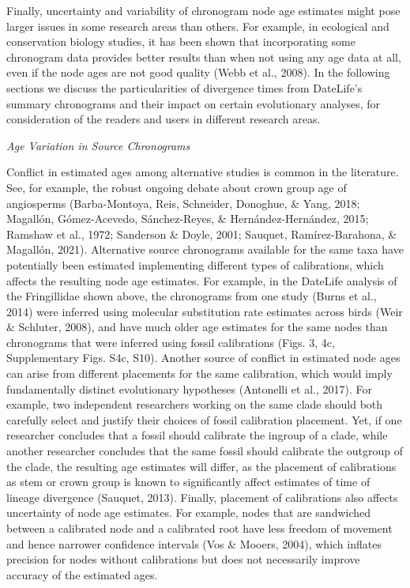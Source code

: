 \documentclass[english,man]{apa6}
\begin{document}
Finally, uncertainty and variability of chronogram node age estimates might pose larger issues in some research areas than others. For example, in ecological and conservation biology studies, it has been shown that incorporating some chronogram data provides better results than when not using any age data at all, even if the node ages are not good quality (Webb et al., 2008). In the following sections we discuss the particularities of divergence times from DateLife's summary chronograms and their impact on certain evolutionary analyses, for consideration of the readers and users in different research areas.

\begin{center}
\emph{Age Variation in Source Chronograms}
\end{center}

Conflict in estimated ages among alternative studies is common in the literature. See, for example, the robust ongoing debate about crown group age of angiosperms (Barba-Montoya, Reis, Schneider, Donoghue, \& Yang, 2018; Magallón, Gómez-Acevedo, Sánchez-Reyes, \& Hernández-Hernández, 2015; Ramshaw et al., 1972; Sanderson \& Doyle, 2001; Sauquet, Ramírez-Barahona, \& Magallón, 2021).
Alternative source chronograms available for the same taxa have potentially been estimated implementing different types of calibrations, which affects the resulting node age estimates.
For example, in the DateLife analysis of the Fringillidae shown above, the chronograms from one study (Burns et al., 2014) were inferred using molecular substitution rate estimates across birds (Weir \& Schluter, 2008), and have much older age estimates for the same nodes than chronograms that were inferred using fossil calibrations (Figs. 3, 4c, Supplementary Figs. S4c, S10).
Another source of conflict in estimated node ages can arise from different placements for the same calibration, which would imply fundamentally distinct evolutionary hypotheses (Antonelli et al., 2017).
For example, two independent researchers working on the same clade should both carefully select and justify their choices of fossil calibration placement.
Yet, if one researcher concludes that a fossil should calibrate the ingroup of a clade, while another researcher concludes that the same fossil should calibrate the outgroup of the clade, the resulting age estimates will differ, as the placement of calibrations as stem or crown group is known to significantly affect estimates of time of lineage divergence (Sauquet, 2013).
Finally, placement of calibrations also affects uncertainty of node age estimates. For example, nodes that are sandwiched between a calibrated node and a calibrated root have less freedom of movement and hence narrower confidence intervals (Vos \& Mooers, 2004), which inflates precision for nodes without calibrations but does not necessarily improve accuracy of the estimated ages.
\end{document}
